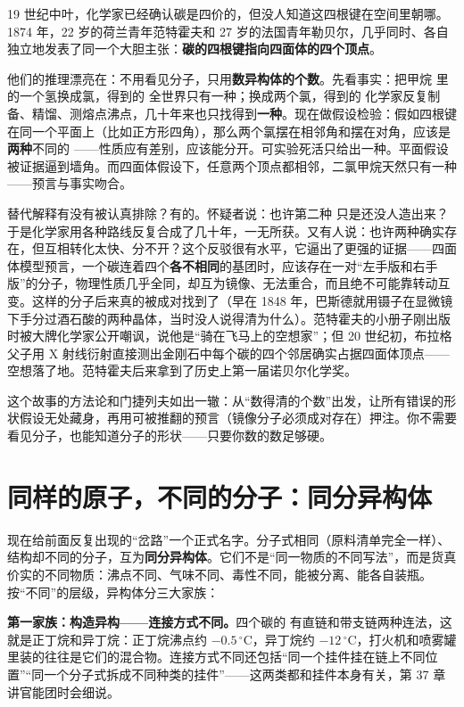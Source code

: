 \begin{zhengju}
19 世纪中叶，化学家已经确认碳是四价的，但没人知道这四根键在空间里朝哪。1874 年，22 岁的荷兰青年范特霍夫和 27 岁的法国青年勒贝尔，几乎同时、各自独立地发表了同一个大胆主张：\textbf{碳的四根键指向四面体的四个顶点}。

他们的推理漂亮在：不用看见分子，只用\textbf{数异构体的个数}。先看事实：把甲烷  里的一个氢换成氯，得到的  全世界只有一种；换成两个氯，得到的  化学家反复制备、精馏、测熔点沸点，几十年来也只找得到\textbf{一种}。现在做假设检验：假如四根键在同一个平面上（比如正方形四角），那么两个氯摆在相邻角和摆在对角，应该是\textbf{两种}不同的 ——性质应有差别，应该能分开。可实验死活只给出一种。平面假设被证据逼到墙角。而四面体假设下，任意两个顶点都相邻，二氯甲烷天然只有一种——预言与事实吻合。

替代解释有没有被认真排除？有的。怀疑者说：也许第二种  只是还没人造出来？于是化学家用各种路线反复合成了几十年，一无所获。又有人说：也许两种确实存在，但互相转化太快、分不开？这个反驳很有水平，它逼出了更强的证据——四面体模型预言，一个碳连着四个\textbf{各不相同}的基团时，应该存在一对“左手版和右手版”的分子，物理性质几乎全同，却互为镜像、无法重合，而且绝不可能靠转动互变。这样的分子后来真的被成对找到了（早在 1848 年，巴斯德就用镊子在显微镜下手分过酒石酸的两种晶体，当时没人说得清为什么）。范特霍夫的小册子刚出版时被大牌化学家公开嘲讽，说他是“骑在飞马上的空想家”；但 20 世纪初，布拉格父子用 X 射线衍射直接测出金刚石中每个碳的四个邻居确实占据四面体顶点——空想落了地。范特霍夫后来拿到了历史上第一届诺贝尔化学奖。

这个故事的方法论和门捷列夫如出一辙：从“数得清的个数”出发，让所有错误的形状假设无处藏身，再用可被推翻的预言（镜像分子必须成对存在）押注。你不需要看见分子，也能知道分子的形状——只要你数的数足够硬。
\end{zhengju}

\section{同样的原子，不同的分子：同分异构体}

现在给前面反复出现的“岔路”一个正式名字。分子式相同（原料清单完全一样）、结构却不同的分子，互为\textbf{同分异构体}。它们不是“同一物质的不同写法”，而是货真价实的不同物质：沸点不同、气味不同、毒性不同，能被分离、能各自装瓶。按“不同”的层级，异构体分三大家族：

\textbf{第一家族：构造异构——连接方式不同。}四个碳的  有直链和带支链两种连法，这就是正丁烷和异丁烷：正丁烷沸点约 $-0.5\,^{\circ}\mathrm{C}$，异丁烷约 $-12\,^{\circ}\mathrm{C}$，打火机和喷雾罐里装的往往是它们的混合物。连接方式不同还包括“同一个挂件挂在链上不同位置”“同一个分子式拆成不同种类的挂件”——这两类都和挂件本身有关，第 37 章讲官能团时会细说。

